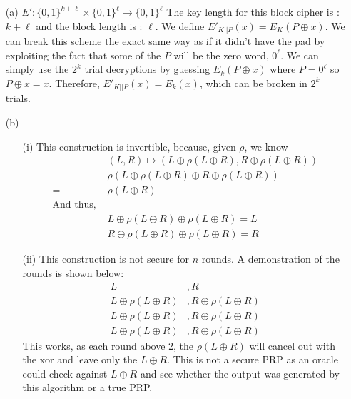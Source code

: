 \documentclass[11pt]{article}
\begin{document}
\begin{itemize}
\item[(a)] 
  $E' : \{0,1\}^{k+\ell} \times\{0,1\}^\ell \rightarrow \{0,1\}^\ell$
  The key length for this block cipher is : $k +\ell$ and the block
  length is : $\ell$. We define $E'_{K||P}(x) = E_K(P\oplus x)$. We can break this 
  scheme the exact same way as if it didn't have the pad by exploiting the fact that some
  of the $P$ will be the zero word, $0^\ell$. We can simply use the $2^k$ trial decryptions
  by guessing $E_k(P \oplus x)$ where $P = 0^\ell$ so $P \oplus x = x$. Therefore, 
  $E'_{K||P}(x) = E_k(x)$, which can be broken in $2^k$ trials.
\item[(b)] 
  \begin{itemize}
    \item[(i)]
      This construction is invertible, because, given $\rho$, we know 
      \begin{align}
  & (L,R) \mapsto (L\oplus\rho(L\oplus R), R \oplus \rho(L\oplus R)) \nonumber \\
  &  \rho(L\oplus\rho(L\oplus R) \oplus R \oplus \rho(L\oplus R)) \nonumber \\
        = & \rho(L\oplus R) \nonumber \\
        \text{And thus, }&\nonumber \\
                         & L\oplus \rho(L\oplus R) \oplus \rho(L\oplus R) = L \nonumber \\
                         & R\oplus \rho(L\oplus R) \oplus \rho(L\oplus R) = R \nonumber 
      \end{align}
    \item[(ii)] This construction is not secure for $n$ rounds. A demonstration of the 
      rounds is shown below:
      \begin{align}
        \tag{Round 1}  L &, R  \\
        \tag{Round 2} L \oplus \rho(L\oplus R)  &, R \oplus \rho(L\oplus R)  \\
        \tag{Round 3} L \oplus \rho(L\oplus R)  &, R \oplus \rho(L\oplus R)  \\
        \tag{Round n} L \oplus \rho(L\oplus R)  &, R \oplus \rho(L\oplus R)  
      \end{align}
      This works, as each round above 2, the $\rho(L\oplus R)$ will cancel out with the xor
      and leave only the $L\oplus R$. This is not a secure PRP as an oracle could check against
      $L\oplus R$ and see whether the output was generated by this algorithm or a true PRP.
  \end{itemize}
\end{itemize}
\end{document}
